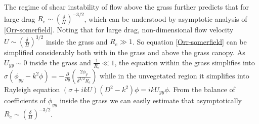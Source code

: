 \documentclass[aps,prl,twocolumn,showpacs,superscriptaddress,groupedaddress,10pt]{revtex4-1}  %
\newcommand{\del}{\partial}
\begin{document}
\newline
The regime of shear instability of flow above the 
grass further predicts that for large drag $R_e \sim (\frac{\delta}{H})^{-3/2}$, which can be understood by asymptotic analysis of \eqref{Orr-somerfield}.
Noting that for large drag, non-dimensional flow velocity $U \sim (\frac{\delta}{H})^{3/2}$ inside the grass and $R_{e} \gg 1$. So equation \eqref{Orr-somerfield}
can be simplified considerably both with in the grass and above the grass canopy. As $U_{yy}\sim 0$ inside the grass and $\frac{1}{R_e} \ll 1$,
the equation within the grass simplifies into
$\sigma\left(\phi_{yy}-k^2\phi\right) = -\frac{\del}{\del y}\left(\frac{2\phi_y}{\delta^{3/2}R_e}\right)$ while in the unvegetated region it simplifies into Rayleigh equation 
$ \left(\sigma+ikU\right) \left(D^2-k^2\right)\phi =  ikU_{yy}\phi$. From the balance of coefficients of $\phi_{yy}$ inside the grass we can easily estimate that asymptotically 
$R_e \sim (\frac{\delta}{H})^{-3/2}$.
\end{document}
